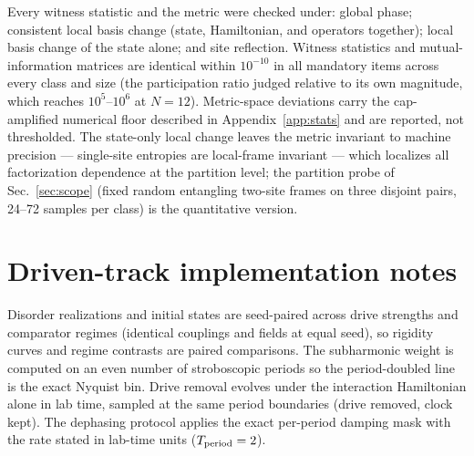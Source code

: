 \documentclass[a4paper,11pt,noarxiv]{quantumarticle}
\begin{document}
Every witness statistic and the metric were checked under: global
phase; consistent local basis change (state, Hamiltonian, and operators
together); local basis change of the state alone; and site reflection.
Witness statistics and mutual-information matrices are identical within
$10^{-10}$ in all mandatory items across every class and size (the
participation ratio judged relative to its own magnitude, which reaches
$10^5$--$10^6$ at $N=12$). Metric-space deviations carry the
cap-amplified numerical floor described in Appendix~\ref{app:stats} and
are reported, not thresholded. The state-only local change leaves the
metric invariant to machine precision --- single-site entropies are
local-frame invariant --- which localizes all factorization dependence
at the partition level; the partition probe of Sec.~\ref{sec:scope}
(fixed random entangling two-site frames on three disjoint pairs,
24--72 samples per class) is the quantitative version.

\section{Driven-track implementation notes}\label{app:tb}

Disorder realizations and initial states are seed-paired across drive
strengths and comparator regimes (identical couplings and fields at
equal seed), so rigidity curves and regime contrasts are paired
comparisons. The subharmonic weight is computed on an even number of
stroboscopic periods so the period-doubled line is the exact Nyquist
bin. Drive removal evolves under the interaction Hamiltonian alone in lab
time, sampled at the same period boundaries (drive removed, clock
kept). The dephasing protocol applies the exact per-period damping mask
with the rate stated in lab-time units ($T_{\rm period} = 2$).



\end{document}

